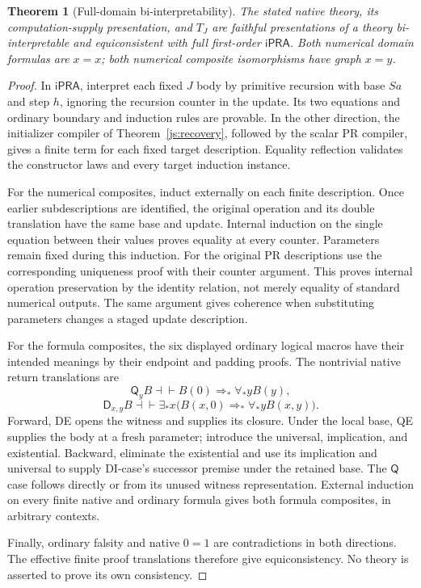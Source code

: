 \documentclass[11pt,letterpaper]{article}
\newtheorem{theorem}{Theorem}[section]
\theoremstyle{definition}\newtheorem{definition}[theorem]{Definition}
\theoremstyle{remark}\newtheorem{remark}[theorem]{Remark}
\newcommand{\ipra}{\mathsf{iPRA}}
\newcommand{\D}{\mathsf D}
\newcommand{\Q}{\mathsf Q}
\begin{document}
\begin{theorem}[Full-domain bi-interpretability]\label{thm:main}
The stated native theory, its computation-supply presentation, and $T_J$
are faithful presentations of a theory bi-interpretable and equiconsistent
with full first-order $\ipra$. Both numerical domain formulas are $x=x$;
both numerical composite isomorphisms have graph $x=y$.
\end{theorem}
\begin{proof}
In $\ipra$, interpret each fixed $J$ body by primitive recursion with
base $Sa$ and step $h$, ignoring the recursion counter in the update.
Its two equations and ordinary boundary and induction rules are provable.
In the other direction, the initializer compiler of
Theorem~\ref{js:recovery}, followed by the scalar PR compiler, gives a
finite term for each fixed target description. Equality reflection
validates the constructor laws and every target induction instance.

For the numerical composites, induct externally on each finite
description. Once earlier subdescriptions are identified, the original
operation and its double translation have the same base and update.
Internal induction on the single equation between their values proves
equality at every counter. Parameters remain fixed during this induction.
For the original PR descriptions use the corresponding uniqueness proof
with their counter argument. This proves internal operation preservation
by the identity relation, not merely equality of standard numerical
outputs. The same argument gives coherence when substituting parameters
changes a staged update description.

For the formula composites, the six displayed ordinary logical macros
have their intended meanings by their endpoint and padding proofs.
The nontrivial native return translations are
\[
 \Q_yB\dashv\vdash B(0)\Rightarrow_*\forall_*yB(y),
\]
\[
 \D_{x,y}B\dashv\vdash
 \exists_*x\bigl(B(x,0)\Rightarrow_*\forall_*yB(x,y)\bigr).
\]
Forward, DE opens the witness and supplies its closure. Under the local
base, QE supplies the body at a fresh parameter; introduce the universal,
implication, and existential. Backward, eliminate the existential and use
its implication and universal to supply DI-case's successor premise under
the retained base. The $\Q$ case follows directly or from its unused
witness representation. External induction on every finite native and
ordinary formula gives both formula composites, in arbitrary contexts.

Finally, ordinary falsity and native $0=1$ are contradictions in both
directions. The effective finite proof translations therefore give
equiconsistency. No theory is asserted to prove its own consistency.
\end{proof}
\end{document}
